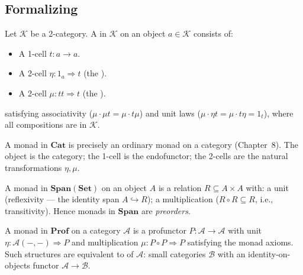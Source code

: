 \subsection{Formalizing}

\begin{definition}
\label{def:monad-in-2cat}
Let $\mathcal{K}$ be a 2-category. A  in $\mathcal{K}$ on an
object $a \in \mathcal{K}$ consists of:
\begin{itemize}
  \item A 1-cell $t : a \to a$.
  \item A 2-cell $\eta : 1_a \Rightarrow t$ (the ).
  \item A 2-cell $\mu : t t \Rightarrow t$ (the ).
\end{itemize}
satisfying associativity ($\mu \cdot \mu t = \mu \cdot t \mu$) and unit laws
($\mu \cdot \eta t = \mu \cdot t \eta = 1_t$), where all compositions are in
$\mathcal{K}$.
\end{definition}

\begin{example_thm}
A monad in $\mathbf{Cat}$ is precisely an ordinary monad on a category
(Chapter~8). The object is the category; the 1-cell is the endofunctor; the
2-cells are the natural transformations $\eta, \mu$.
\end{example_thm}

\begin{example_thm}
A monad in $\mathbf{Span}(\mathbf{Set})$ on an object $A$ is a relation
$R \subseteq A \times A$ with: a unit (reflexivity — the identity span $A
\hookrightarrow R$); a multiplication ($R \circ R \subseteq R$, i.e.,
transitivity). Hence monads in $\mathbf{Span}$ are \emph{preorders}.
\end{example_thm}

\begin{example_thm}
A monad in $\mathbf{Prof}$ on a category $\mathcal{A}$ is a profunctor
$P : \mathcal{A} \to \mathcal{A}$ with unit $\eta : \mathcal{A}(-, -)
\Rightarrow P$ and multiplication $\mu : P \circ P \Rightarrow P$
satisfying the monad axioms. Such structures are equivalent to
 of $\mathcal{A}$: small categories $\mathcal{B}$
with an identity-on-objects functor $\mathcal{A} \to \mathcal{B}$.
\end{example_thm}


